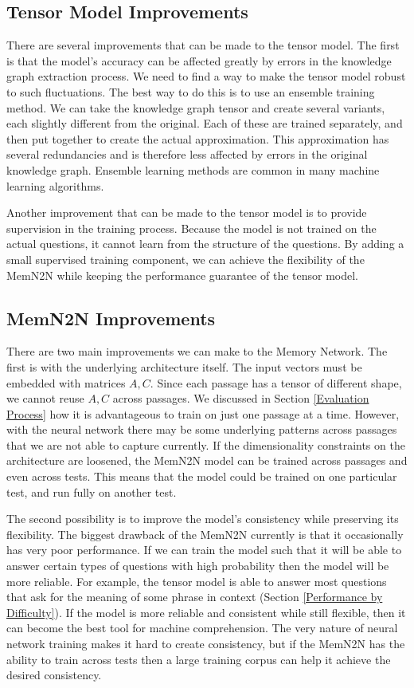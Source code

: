 \documentclass[pageno]{final_paper}
\begin{document}
\subsection{Tensor Model Improvements}
\label{Tensor Model Improvements}

There are several improvements that can be made to the tensor model. The first
is that the model's accuracy can be affected greatly by errors in the knowledge
graph extraction process. We need to find a way to make the tensor model robust
to such fluctuations. The best way to do this is to use an ensemble training
method. We can take the knowledge graph tensor and create several variants, each
slightly different from the original. Each of these are trained separately, and
then put together to create the actual approximation. This approximation has
several redundancies and is therefore less affected by errors in the original
knowledge graph. Ensemble learning methods are common in many machine learning
algorithms.

Another improvement that can be made to the tensor model is to provide
supervision in the training process. Because the model is not trained on the
actual questions, it cannot learn from the structure of the questions. By adding
a small supervised training component, we can achieve the flexibility of the
MemN2N while keeping the performance guarantee of the tensor model.

\subsection{MemN2N Improvements}
\label{MemN2N Improvements}

There are two main improvements we can make to the Memory Network. The first is
with the underlying architecture itself. The input vectors must be embedded with
matrices $A,C$. Since each passage has a tensor of different shape, we cannot
reuse $A,C$ across passages. We discussed in Section \ref{Evaluation Process}
how it is advantageous to train on just one passage at a time. However, with the
neural network there may be some underlying patterns across passages that we are
not able to capture currently. If the dimensionality constraints on the
architecture are loosened, the MemN2N model can be trained across passages and
even across tests. This means that the model could be trained on one particular
test, and run fully on another test.

The second possibility is to improve the model's consistency while preserving
its flexibility. The biggest drawback of the MemN2N currently is that it
occasionally has very poor performance. If we can train the model such that it
will be able to answer certain types of questions with high probability then the
model will be more reliable. For example, the tensor model is able to answer
most questions that ask for the meaning of some phrase in context (Section
\ref{Performance by Difficulty}). If the model is more reliable and consistent
while still flexible, then it can become the best tool for machine
comprehension. The very nature of neural network training makes it hard to
create consistency, but if the MemN2N has the ability to train across tests then
a large training corpus can help it achieve the desired consistency.
\end{document}
